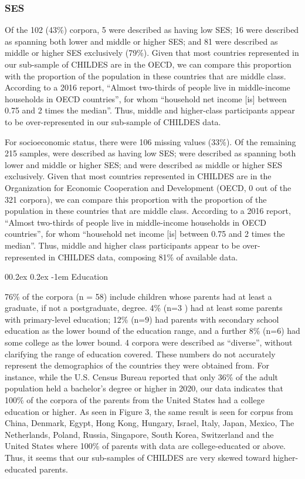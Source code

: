 \documentclass[
  man,floatsintext]{apa6}
\makeatletter
\let\oldparagraph\paragraph
\renewcommand{\paragraph}[1]{\oldparagraph{#1}\mbox{}}
\renewcommand{\paragraph}{\@startsection{paragraph}{4}{\parindent}%
  {0\baselineskip \@plus 0.2ex \@minus 0.2ex}%
  {-1em}%
  {\normalfont\normalsize\bfseries\itshape\typesectitle}}
\makeatother
\begin{document}
\subsubsection{SES}\label{ses}

Of the 102 (43\%) corpora, 5 were described as having low SES; 16 were described as spanning both lower and middle or higher SES; and 81 were described as middle or higher SES exclusively (79\%). Given that most countries represented in our sub-sample of CHILDES are in the OECD, we can compare this proportion with the proportion of the population in these countries that are middle class. According to a 2016 report, ``Almost two-thirds of people live in middle-income households in OECD countries'', for whom ``household net income {[}is{]} between 0.75 and 2 times the median''. Thus, middle and higher-class participants appear to be over-represented in our sub-sample of CHILDES data.

For socioeconomic status, there were 106 missing values (33\%). Of the remaining 215 samples, were described as having low SES; were described as spanning both lower and middle or higher SES; and were described as middle or higher SES exclusively. Given that most countries represented in CHILDES are in the Organization for Economic Cooperation and Development (OECD, 0 out of the 321 corpora), we can compare this proportion with the proportion of the population in these countries that are middle class. According to a 2016 report, ``Almost two-thirds of people live in middle-income households in OECD countries'', for whom ``household net income {[}is{]} between 0.75 and 2 times the median''. Thus, middle and higher class participants appear to be over-represented in CHILDES data, composing 81\% of available data.

\paragraph{Education}\label{education}

76\% of the corpora (n = 58) include children whose parents had at least a graduate, if not a postgraduate, degree. 4\% (n=3 ) had at least some parents with primary-level education; 12\% (n=9) had parents with secondary school education as the lower bound of the education range, and a further 8\% (n=6) had some college as the lower bound. 4 corpora were described as ``diverse'', without clarifying the range of education covered. These numbers do not accurately represent the demographics of the countries they were obtained from. For instance, while the U.S. Census Bureau reported that only 36\% of the adult population held a bachelor's degree or higher in 2020, our data indicates that 100\% of the corpora of the parents from the United States had a college education or higher. As seen in Figure 3, the same result is seen for corpus from China, Denmark, Egypt, Hong Kong, Hungary, Israel, Italy, Japan, Mexico, The Netherlands, Poland, Russia, Singapore, South Korea, Switzerland and the United States where 100\% of parents with data are college-educated or above. Thus, it seems that our sub-samples of CHILDES are very skewed toward higher-educated parents.
\end{document}
